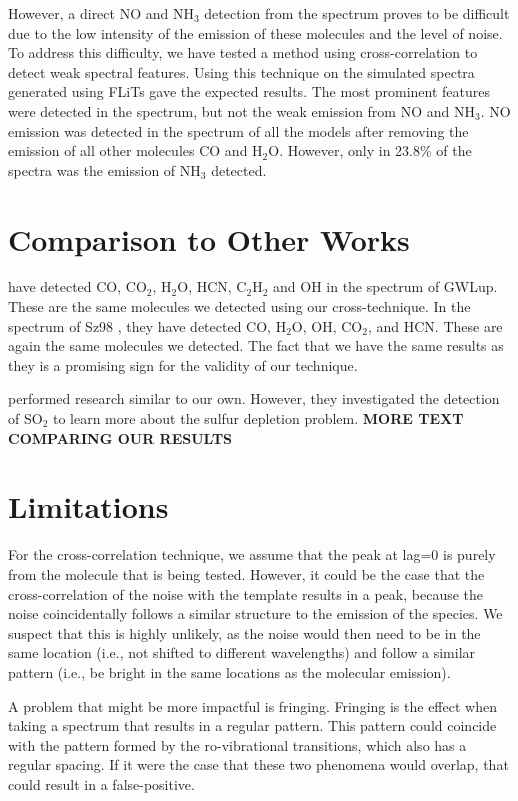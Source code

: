 \documentclass[oneside, single, authoryear, semicolon, 12pt]{lion-msc}
\newcommand{\4}{$_4$}
\newcommand{\3}{$_3$}
\newcommand{\2}{$_2$}
\begin{document}
However, a direct NO and NH\3 detection from the spectrum proves to be difficult due to the low intensity of the emission of these molecules and the level of noise. To address this difficulty, we have tested a method using cross-correlation to detect weak spectral features. Using this technique on the simulated spectra generated using FLiTs gave the expected results. The most prominent features were detected in the spectrum, but not the weak emission from NO and NH\3. NO emission was detected in the spectrum of all the models after removing the emission of all other molecules CO and H\2O. However, only in 23.8\% of the spectra was the emission of NH\3 detected.


\section{Comparison to Other Works}
\cite{Grant_2023} have detected CO, CO\2, H\2O, HCN, C\2H\2 and OH in the spectrum of GWLup. These are the same molecules we detected using our cross-technique. In the spectrum of Sz98 \cite{Gasman_2023}, they have detected CO, H\2O, OH, CO\2, and HCN. These are again the same molecules we detected. The fact that we have the same results as they is a promising sign for the validity of our technique. 

\cite{groningenthesis} performed research similar to our own. However, they investigated the detection of SO\2 to learn more about the sulfur depletion problem. \textbf{MORE TEXT COMPARING OUR RESULTS}

\section{Limitations}
For the cross-correlation technique, we assume that the peak at lag=0 is purely from the molecule that is being tested. However, it could be the case that the cross-correlation of the noise with the template results in a peak, because the noise coincidentally follows a similar structure to the emission of the species. We suspect that this is highly unlikely, as the noise would then need to be in the same location (i.e., not shifted to different wavelengths) and follow a similar pattern (i.e., be bright in the same locations as the molecular emission). 

A problem that might be more impactful is fringing. Fringing is the effect when taking a spectrum that results in a regular pattern. This pattern could coincide with the pattern formed by the ro-vibrational transitions, which also has a regular spacing. If it were the case that these two phenomena would overlap, that could result in a false-positive.
\end{document}
